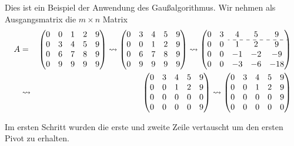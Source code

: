 Dies ist ein Beispiel der Anwendung des Gaußalgorithmus.
Wir nehmen als  Ausgangsmatrix die $m\times n$ Matrix 
\begin{eqnarray*}
A&=&\begin{pmatrix}
0 & 0 & 1 & 2 & 9 \\ 
0 & 3 & 4 & 5 & 9 \\ 
0 & 6 & 7 & 8 & 9 \\ 
0 & 9 & 9 & 9 & 9
\end{pmatrix} 
\leadsto
\begin{pmatrix}
0 & 3 & 4 & 5 & 9 \\ 
0 & 0 & 1 & 2 & 9 \\ 
0 & 6 & 7 & 8 & 9 \\ 
0 & 9 & 9 & 9 & 9
\end{pmatrix}
\leadsto 
\begin{pmatrix}
 0 & 3 & 4 & 5 & 9 \\ \cdashline{3-5}
 0 & 0 & 1 & 2 & 9 \\ 
 0 & 0 & -1 & -2 & -9 \\ 
 0 & 0 & -3 & -6 & -18
\end{pmatrix}\\
&\leadsto &
\begin{pmatrix}
  0 & 3 & 4 & 5 & 9 \\ 
  0 & 0 & 1 & 2 & 9 \\ 
  0 & 0 & 0 & 0 & 0 \\ 
  0 & 0 & 0 & 0 & 9
  \end{pmatrix}
\leadsto
\begin{pmatrix}
  0 & 3 & 4 & 5 & 9 \\ 
  0 & 0 & 1 & 2 & 9 \\ 
  0 & 0 & 0 & 0 & 9 \\ 
  0 & 0 & 0 & 0 & 0
 \end{pmatrix}  
 \end{eqnarray*}
 
 Im ersten Schritt wurden die erste und zweite Zeile vertauscht um den ersten Pivot zu erhalten. 
